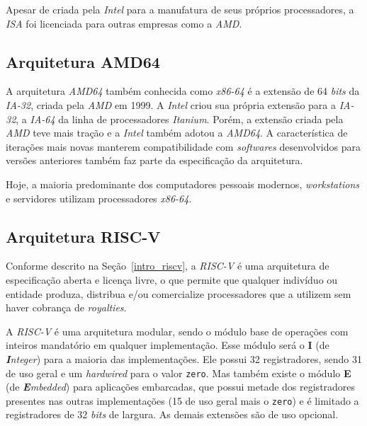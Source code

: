    { Apesar de criada pela \textit{Intel} para a manufatura de seus próprios
        processadores, a \textit{ISA} foi licenciada para outras empresas como a
        \textit{AMD}.
    }

    \subsection{Arquitetura AMD64}
    { A arquitetura \textit{AMD64} também conhecida como \textit{x86-64} é a
        extensão de 64 \textit{bits} da \textit{IA-32}, criada pela \textit{AMD}
        em 1999. A \textit{Intel} criou sua própria extensão para a \textit{IA-32},
        a \textit{IA-64} da linha de processadores \textit{Itanium}. Porém, a
        extensão criada pela \textit{AMD} teve mais tração e a \textit{Intel}
        também adotou a \textit{AMD64}. A característica de iterações mais novas
        manterem compatibilidade com \textit{softwares} desenvolvidos para versões
        anteriores também faz parte da especificação da arquitetura.
    }

    { Hoje, a maioria predominante dos computadores pessoais modernos,
        \textit{workstations} e servidores utilizam processadores \textit{x86-64}.
    }

    \subsection{Arquitetura RISC-V}\label{riscv_basic_arch}
    { Conforme descrito na Seção~\ref{intro_riscv}, a \textit{RISC-V} é uma
        arquitetura de especificação aberta e licença livre, o que permite que
        qualquer indivíduo ou entidade produza, distribua e/ou comercialize
        processadores que a utilizem sem haver cobrança de \textit{royalties}.
    }

    { A \textit{RISC-V} é uma arquitetura modular, sendo o módulo base de
        operações com inteiros mandatório em qualquer implementação.
        Esse módulo será o \textbf{I} (de \textit{\textbf{I}nteger}) para a
        maioria das implementações. Ele possui 32 registradores, sendo 31 de uso
        geral e um \textit{hardwired} para o valor \texttt{zero}. Mas também existe
        o módulo \textbf{E} (de \textit{\textbf{E}mbedded}) para aplicações embarcadas,
        que possui metade dos registradores presentes nas outras implementações
        (15 de uso geral mais o \texttt{zero}) e é limitado a registradores de
        32 \textit{bits} de largura. As demais extensões são de uso opcional.
    }

